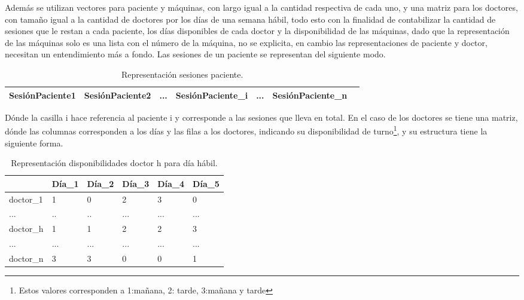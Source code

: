 \documentclass[letter, 10pt]{article}
\begin{document}
Además se utilizan vectores para paciente y máquinas, con largo igual a la cantidad respectiva de cada uno, y una matriz para los doctores, con tamaño igual a la cantidad de doctores por los días de una semana hábil, todo esto con la finalidad de contabilizar la cantidad de sesiones que le restan a cada paciente, los días disponibles de cada doctor y la disponibilidad de las máquinas, dado que la representación de las máquinas solo es una lista con el número de la máquina, no se explicita, en cambio las representaciones de paciente y doctor, necesitan un entendimiento más a fondo. Las sesiones de un paciente se representan del siguiente modo.

\begin{table}[h]
\centering
\begin{tabular}{|c|c|c|c|c|c|c|}
\hline
SesiónPaciente1 & SesiónPaciente2 & ... & SesiónPaciente\_i & ... & SesiónPaciente\_n \\ \hline
\end{tabular}
\caption{Representación sesiones paciente.}
\label{table:pa}
\end{table}

Dónde la casilla i hace referencia al paciente i y corresponde a las sesiones que lleva en total.
En el caso de los doctores se tiene una matriz, dónde las columnas corresponden a los días  y las filas a los doctores, indicando su disponibilidad de turno\footnote{Estos valores corresponden a 1:mañana, 2: tarde, 3:mañana y tarde}, y su estructura tiene la siguiente forma.

\begin{table}[ht]
\centering
\begin{tabular}{l|l|l|l|l|l|}
\cline{2-6}
                                & Día\_1 & Día\_2 & Día\_3 & Día\_4 & Día\_5 \\ \hline
\multicolumn{1}{|l|}{doctor\_1} & 1      & 0      & 2      & 3      & 0      \\ \hline
\multicolumn{1}{|l|}{...}       & ..     & ..     & ...    & ...    & ...    \\ \hline
\multicolumn{1}{|l|}{doctor\_h} & 1      & 1      & 2      & 2      & 3      \\ \hline
\multicolumn{1}{|l|}{...}       & ...    & ...    & ...    & ...    & ...    \\ \hline
\multicolumn{1}{|l|}{doctor\_n} & 3      & 3      & 0      & 0      & 1      \\ \hline
\end{tabular}
\caption{Representación disponibilidades doctor h para día hábil.}
\label{table:pab}
\end{table}
\end{document}
